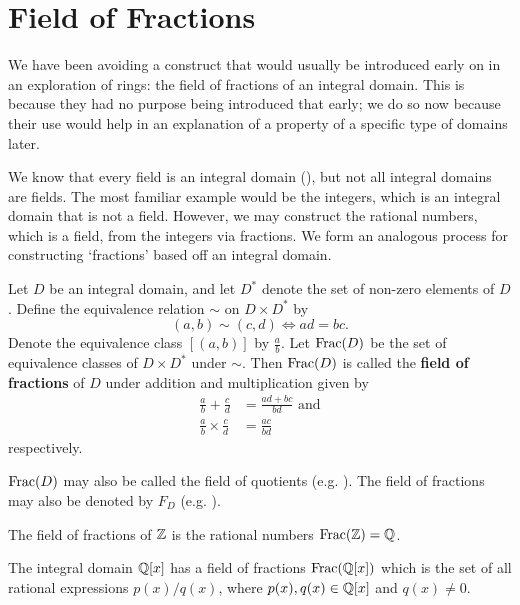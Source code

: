 \section{Field of Fractions}
We have been avoiding a construct that would usually be introduced early on in an exploration of rings: the field of fractions of an integral domain. This is because they had no purpose being introduced that early; we do so now because their use would help in an explanation of a property of a specific type of domains later.

We know that every field is an integral domain (), but not all integral domains are fields. The most familiar example would be the integers, which is an integral domain that is not a field. However, we may construct the rational numbers, which is a field, from the integers via fractions. We form an analogous process for constructing `fractions' based off an integral domain.

\begin{definition}\label{definition-field-of-fractions}
    Let $D$ be an integral domain, and let $D^\ast$ denote the set of non-zero elements of $D$. Define the equivalence relation $\sim$ on $D \times D^\ast$ by
    \[
        (a,b) \mathrel{\sim} (c,d) \iff ad = bc.
    \]
    Denote the equivalence class $[(a, b)]$ by $\frac ab$. Let $\mathrm{Frac}(D)$ be the set of equivalence classes of $D \times D^\ast$ under $\sim$. Then $\mathrm{Frac}(D)$ is called the \textbf{field of fractions} of $D$ under addition and multiplication given by
    \begin{align*}
        \frac ab + \frac cd &= \frac{ad+bc}{bd} \text{ and}\\
        \frac ab \times \frac cd &= \frac{ac}{bd}
    \end{align*}
    respectively.
\end{definition}
\begin{remark}
    $\mathrm{Frac}(D)$ may also be called the field of quotients (e.g. \cite[p.~269]{gallian_2016}). The field of fractions may also be denoted by $F_D$ (e.g. \cite[p.~226]{judson_beezer_2022}).
\end{remark}

\begin{example}
    The field of fractions of $\mathbb{Z}$ is the rational numbers $\mathrm{Frac}(\mathbb{Z}) = \mathbb{Q}$.
\end{example}
\begin{example}
    The integral domain $\mathbb{Q}[x]$ has a field of fractions $\mathrm{Frac}(\mathbb{Q}[x])$ which is the set of all rational expressions $p(x)/q(x)$, where $p(x), q(x) \in \mathbb{Q}[x]$ and $q(x) \neq 0$.
\end{example}

